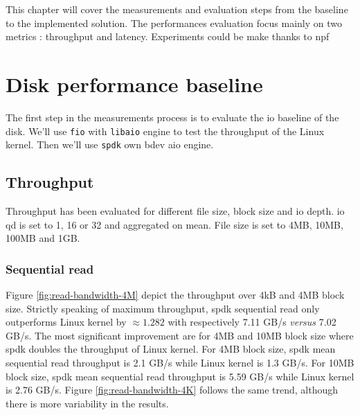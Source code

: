 This chapter will cover the measurements and evaluation steps from the baseline to the implemented solution. The performances evaluation focus mainly on two metrics : throughput and latency. Experiments could be make thanks to \acrfull{npf} \cite{barbette_tbarbettenpf_2026}

\section{Disk performance baseline}

The first step in the measurements process is to evaluate the \acrfull{io} baseline of the disk. We'll use \texttt{\acrfull{fio}} \cite{noauthor_kernelgitaxboefiogit_nodate} with \texttt{libaio} \cite{libaio} engine to test the throughput of the Linux kernel. Then we'll use \texttt{\acrshort{spdk}} own \acrshort{bdev} \acrfull{aio} engine.

\subsection{Throughput}


Throughput has been evaluated for different file size, block size and \acrshort{io} depth. \acrshort{io} \acrshort{qd} is set to 1, 16 or 32 and aggregated on mean.
File size is set to 4MB, 10MB, 100MB and 1GB. 


\subsubsection{Sequential read}

Figure \ref{fig:read-bandwidth-4M} depict the throughput over 4kB and 4MB block size.  Strictly speaking of maximum throughput, \acrshort{spdk} sequential read only outperforms Linux kernel by $\approx 1.282$ with respectively 7.11 GB/s \textit{versus} 7.02 GB/s. The most significant improvement are for 4MB and 10MB block size where \acrshort{spdk} doubles the throughput of Linux kernel. For 4MB block size, \acrshort{spdk} mean sequential read throughput is 2.1 GB/s while Linux kernel is 1.3 GB/s. For 10MB block size, \acrshort{spdk} mean sequential read throughput is 5.59 GB/s while Linux kernel is 2.76 GB/s. Figure \ref{fig:read-bandwidth-4K} follows the same trend, although there is more variability in the results.

